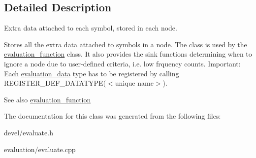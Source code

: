 \subsection{Detailed Description}
Extra data attached to each symbol, stored in each node. 

Stores all the extra data attached to symbols in a node. The class is used by the \hyperlink{classevaluation__function}{evaluation\+\_\+function} class. It also provides the sink functions determining when to ignore a node due to user-\/defined criteria, i.\+e. low frquency counts. Important\+: Each \hyperlink{classevaluation__data}{evaluation\+\_\+data} type has to be registered by calling R\+E\+G\+I\+S\+T\+E\+R\+\_\+\+D\+E\+F\+\_\+\+D\+A\+T\+A\+T\+Y\+P\+E($<$unique name$>$). \begin{DoxySeeAlso}{See also}
\hyperlink{classevaluation__function}{evaluation\+\_\+function} 
\end{DoxySeeAlso}


The documentation for this class was generated from the following files\+:\begin{DoxyCompactItemize}
\item 
devel/evaluate.\+h\item 
evaluation/evaluate.\+cpp\end{DoxyCompactItemize}
